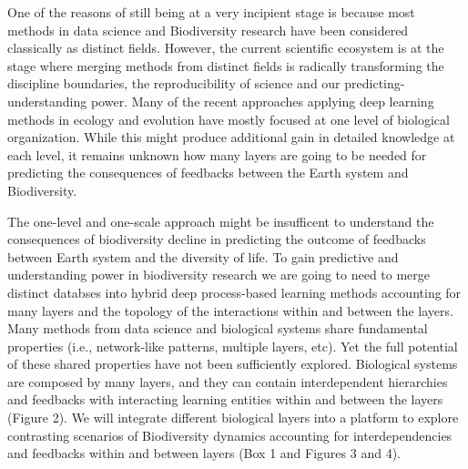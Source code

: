 \documentclass[authoryear,1p,12pt]{elsarticle}
\begin{document}
One of the reasons of still being at a very incipient stage is because
most methods in data science and Biodiversity research have been
considered classically as distinct fields. However, the current
scientific ecosystem is at the stage where merging methods from
distinct fields is radically transforming the discipline boundaries,
the reproducibility of science and our predicting-understanding
power\citep{Reichsteietal2019}. Many of the recent approaches applying
deep learning methods in ecology and evolution have mostly focused at
one level of biological organization\citep{Sheehan&Song:2016}. While this might produce
additional gain in detailed knowledge at each level, it remains
unknown how many layers are going to be needed for predicting the
consequences of feedbacks between the Earth system and Biodiversity.

The one-level and one-scale approach might be insufficent to
understand the consequences of biodiversity decline in predicting the
outcome of feedbacks between Earth system and the diversity of
life. To gain predictive and understanding power in biodiversity
research we are going to need to merge distinct databses into hybrid
deep process-based learning methods accounting for many layers and the
topology of the interactions within and between the
layers\citep{Melianetal:2018}. Many methods
from data science and biological systems share fundamental properties
(i.e., network-like patterns, multiple layers, etc). Yet the full
potential of these shared properties have not been sufficiently
explored. Biological systems are composed by many layers, and they can
contain interdependent hierarchies and feedbacks with interacting
learning entities within and between the layers (Figure 2). We will
integrate different biological layers into a platform to explore
contrasting scenarios of Biodiversity dynamics accounting for
interdependencies and feedbacks within and between layers (Box 1 and
Figures 3 and 4).
\end{document}
